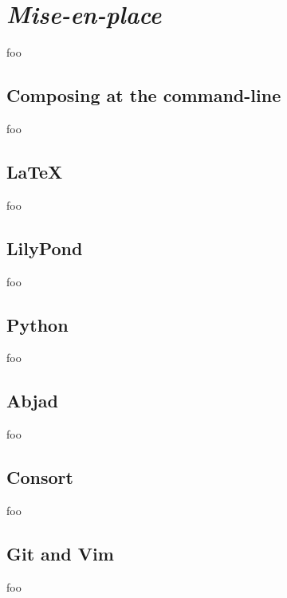 \chapter{\emph{Mise-en-place}}

foo

\section{Composing at the command-line}

foo

\section{LaTeX}

foo

\section{LilyPond}

foo

\section{Python}

foo

\section{Abjad}

foo

\section{Consort}

foo

\section{Git and Vim}

foo